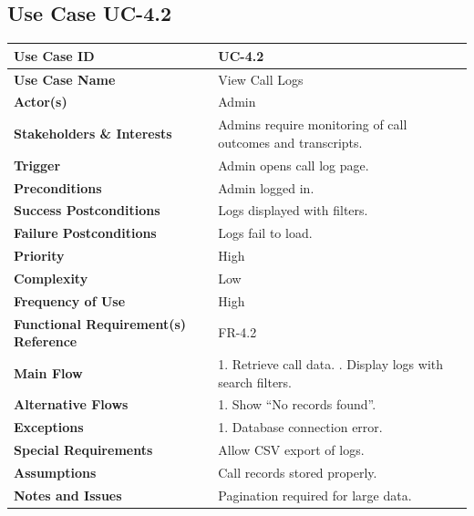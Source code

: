 \documentclass[12pt,a4paper]{report}
\begin{document}
\subsection*{Use Case UC-4.2}
\begin{longtable}{|p{4cm}|p{9cm}|}
\hline
\textbf{Use Case ID} & UC-4.2 \\ \hline
\textbf{Use Case Name} & View Call Logs \\ \hline
\textbf{Actor(s)} & Admin \\ \hline
\textbf{Stakeholders \& Interests} & Admins require monitoring of call outcomes and transcripts. \\ \hline
\textbf{Trigger} & Admin opens call log page. \\ \hline
\textbf{Preconditions} & Admin logged in. \\ \hline
\textbf{Success Postconditions} & Logs displayed with filters. \\ \hline
\textbf{Failure Postconditions} & Logs fail to load. \\ \hline
\textbf{Priority} & High \\ \hline
\textbf{Complexity} & Low \\ \hline
\textbf{Frequency of Use} & High \\ \hline
\textbf{Functional Requirement(s) Reference} & FR-4.2 \\ \hline
\textbf{Main Flow} &
1. Retrieve call data. \newline
2. Display logs with search filters. \\ \hline
\textbf{Alternative Flows} &
1. Show “No records found”. \\ \hline
\textbf{Exceptions} &
1. Database connection error. \\ \hline
\textbf{Special Requirements} &
Allow CSV export of logs. \\ \hline
\textbf{Assumptions} &
Call records stored properly. \\ \hline
\textbf{Notes and Issues} &
Pagination required for large data. \\ \hline
\end{longtable}

\end{document}
